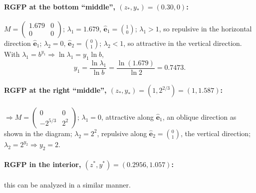 \paragraph{RGFP at the bottom ``middle'', $(z_*,y_*) = (0.30,0)$:}
$M = \left(\begin{smallmatrix}1.679&0\\0&0\end{smallmatrix}\right)$; $\lambda_1 = 1.679$,
$\hat{\mathbf e}_1 = \binom10$; $\lambda_1>1$, so repulsive in the horizontal direction $\hat{\mathbf e}_1$;
$\lambda_2 = 0$, $\hat{\mathbf e}_2 = \binom01$; $\lambda_2<1$, so attractive in the vertical direction. With
$\lambda_1 = b^{y_1}\Rightarrow\ln\lambda_1 = y_1\ln b$,
\begin{equation}
  y_1 = \frac{\ln\lambda_1}{\ln b} = \frac{\ln(1.679)}{\ln 2} = 0.7473 .
\end{equation}

\paragraph{RGFP at the right ``middle'', $(z_*,y_*) = (1,2^{2/3}) = (1,1.587)$:}
$\Rightarrow M = \left(\begin{smallmatrix}0&0\\-2^{5/3}&2^2\end{smallmatrix}\right)$; $\lambda_1 = 0$,
attractive along $\hat{\mathbf e}_1$, an oblique direction as shown in the diagram; $\lambda_2 = 2^2$,
repulsive along $\hat{\mathbf e}_2 = \binom01$, the vertical direction; $\lambda_2 = 2^{y_2}\Rightarrow y_2 = 2$.

\paragraph{RGFP in the interior, $(z^*,y^*) = (0.2956,1.057)$:} this can be analyzed in a similar manner.
